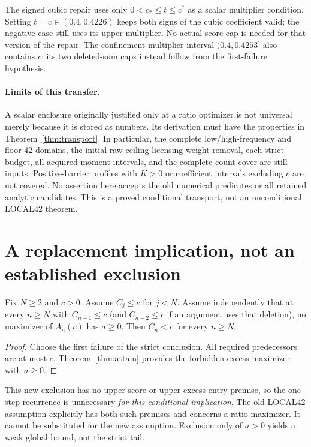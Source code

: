 The signed cubic repair uses only $0<c_*\le t\le c^*$ as a scalar
multiplier condition. Setting $t=c\in(0.4,0.4226)$ keeps both signs of
the cubic coefficient valid; the negative case still uses its upper
multiplier. No actual-score cap is needed for that version of the repair.
The confinement multiplier interval $(0.4,0.4253]$ also contains $c$;
its two deleted-sum caps instead follow from the first-failure hypothesis.

\paragraph{Limits of this transfer.}
A scalar enclosure originally justified only at a ratio optimizer is
not universal merely because it is stored as numbers. Its derivation
must have the properties in Theorem~\ref{thm:transport}. In particular,
the complete low/high-frequency and floor-42 domains, the initial raw
ceiling licensing weight removal, each strict budget, all acquired
moment intervals, and the complete count cover are still inputs.
Positive-barrier profiles with $K>0$ or coefficient intervals excluding
$c$ are not covered. No assertion here accepts the old numerical
predicates or all retained analytic candidates. This is a proved
conditional transport, not an unconditional LOCAL42 theorem.

\section{A replacement implication, not an established exclusion}
\begin{corollary}\label{cor:global}
Fix $N\ge2$ and $c>0$. Assume $C_j\le c$ for $j<N$. Assume independently
that at every $n\ge N$ with $C_{n-1}\le c$ (and $C_{n-2}\le c$ if an
argument uses that deletion), no maximizer of $A_n(c)$ has $a\ge0$.
Then $C_n<c$ for every $n\ge N$.
\end{corollary}
\begin{proof}
Choose the first failure of the strict conclusion. All required
predecessors are at most $c$. Theorem~\ref{thm:attain} provides the
forbidden excess maximizer with $a\ge0$.
\end{proof}
This new exclusion has no upper-score or upper-excess entry premise, so
the one-step recurrence is unnecessary \emph{for this conditional
implication}. The old LOCAL42 assumption explicitly has both such
premises and concerns a ratio maximizer. It cannot be substituted for
the new assumption. Exclusion only of $a>0$ yields a weak global bound,
not the strict tail.

